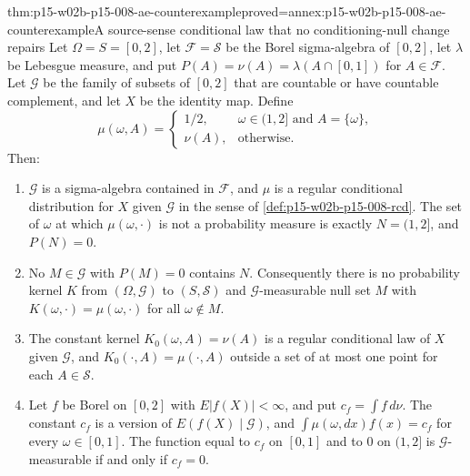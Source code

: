 \begin{hbtheorem}{thm:p15-w02b-p15-008-ae-counterexample}{proved=annex:p15-w02b-p15-008-ae-counterexample}{A source-sense conditional law that no conditioning-null change repairs}
Let \(\Omega=S=[0,2]\), let \(\mathcal F=\mathcal S\) be the Borel
sigma-algebra of \([0,2]\), let \(\lambda\) be Lebesgue measure, and put
\(P(A)=\nu(A)=\lambda(A\cap[0,1])\) for \(A\in\mathcal F\). Let
\(\mathcal G\) be the family of subsets of \([0,2]\) that are countable or
have countable complement, and let \(X\) be the identity map. Define
\[
 \mu(\omega,A)=
 \begin{cases}
  1/2,&\omega\in(1,2]\text{ and }A=\{\omega\},\\
  \nu(A),&\text{otherwise}.
 \end{cases}
\]
Then:
\begin{enumerate}
\item \(\mathcal G\) is a sigma-algebra contained in \(\mathcal F\), and
      \(\mu\) is a regular conditional distribution for \(X\) given
      \(\mathcal G\) in the sense of \cref{def:p15-w02b-p15-008-rcd}.
      The set of \(\omega\) at which \(\mu(\omega,\cdot)\) is not a
      probability measure is exactly \(N=(1,2]\), and \(P(N)=0\).
\item No \(M\in\mathcal G\) with \(P(M)=0\) contains \(N\). Consequently
      there is no probability kernel \(K\) from \((\Omega,\mathcal G)\) to
      \((S,\mathcal S)\) and \(\mathcal G\)-measurable null set \(M\) with
      \(K(\omega,\cdot)=\mu(\omega,\cdot)\) for all \(\omega\notin M\).
\item The constant kernel \(K_0(\omega,A)=\nu(A)\) is a regular conditional
      law of \(X\) given \(\mathcal G\), and \(K_0(\cdot,A)=\mu(\cdot,A)\)
      outside a set of at most one point for each \(A\in\mathcal S\).
\item Let \(f\) be Borel on \([0,2]\) with \(E|f(X)|<\infty\), and put
      \(c_f=\int f\,d\nu\). The constant \(c_f\) is a version of
      \(E(f(X)\mid\mathcal G)\), and
      \(\int\mu(\omega,dx)f(x)=c_f\) for every \(\omega\in[0,1]\).
      The function equal to \(c_f\) on \([0,1]\) and to \(0\) on
      \((1,2]\) is \(\mathcal G\)-measurable if and only if \(c_f=0\).
\end{enumerate}
\end{hbtheorem}

